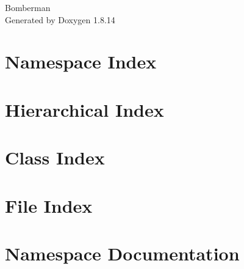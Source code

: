 \documentclass[twoside]{book}
\newcommand{\+}{\discretionary{\mbox{\scriptsize$\hookleftarrow$}}{}{}}
\newcommand{\clearemptydoublepage}{%
  \newpage{\pagestyle{empty}\cleardoublepage}%
}
\begin{document}
\hypersetup{pageanchor=false,
             bookmarksnumbered=true,
             pdfencoding=unicode
            }
\begin{titlepage}
\vspace*{7cm}
\begin{center}%
{\Large Bomberman }\\
\vspace*{1cm}
{\large Generated by Doxygen 1.8.14}\\
\end{center}
\end{titlepage}
\clearemptydoublepage
{}
\tableofcontents
\clearemptydoublepage
{}
\hypersetup{pageanchor=true}

\chapter{Namespace Index}

\chapter{Hierarchical Index}

\chapter{Class Index}

\chapter{File Index}

\chapter{Namespace Documentation}











\end{document}
